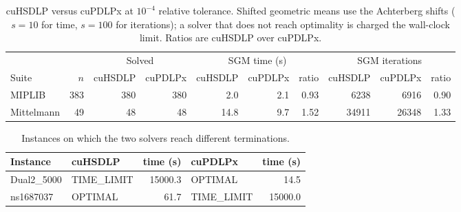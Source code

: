 \begin{table}[t]
\centering
\caption{cuHSDLP versus cuPDLPx at $10^{-4}$ relative tolerance. Shifted geometric means use the Achterberg shifts ($s=10$ for time, $s=100$ for iterations); a solver that does not reach optimality is charged the wall-clock limit.  Ratios are cuHSDLP over cuPDLPx.}
\label{tab:benchmark-summary}
\begin{tabular}{lrrrrrrrrr}
\toprule
& & \multicolumn{2}{c}{Solved} & \multicolumn{3}{c}{SGM time (s)} & \multicolumn{3}{c}{SGM iterations} \\
\cmidrule(lr){3-4}\cmidrule(lr){5-7}\cmidrule(lr){8-10}
Suite & $n$ & cuHSDLP & cuPDLPx & cuHSDLP & cuPDLPx & ratio & cuHSDLP & cuPDLPx & ratio \\
\midrule
MIPLIB & 383 & 380 & 380 & 2.0 & 2.1 & 0.93 & 6238 & 6916 & 0.90 \\
Mittelmann & 49 & 48 & 48 & 14.8 & 9.7 & 1.52 & 34911 & 26348 & 1.33 \\
\bottomrule
\end{tabular}
\end{table}

\begin{table}[t]
\centering
\caption{Instances on which the two solvers reach different terminations.}
\label{tab:benchmark-disagreements}
\begin{tabular}{llrlr}
\toprule
Instance & cuHSDLP & time (s) & cuPDLPx & time (s) \\
\midrule
Dual2\_5000 & TIME\_LIMIT & 15000.3 & OPTIMAL & 14.5 \\
ns1687037 & OPTIMAL & 61.7 & TIME\_LIMIT & 15000.0 \\
\bottomrule
\end{tabular}
\end{table}
